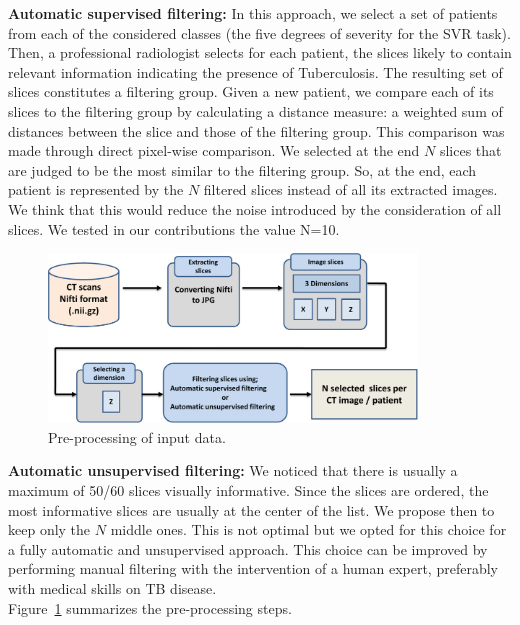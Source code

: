 \documentclass{llncs}
\begin{document}
\textbf{Automatic supervised filtering:} In this approach, we select a set of patients from each of the considered classes (the five degrees of severity for the SVR task). Then, a professional radiologist selects for each patient, the slices likely to contain relevant information indicating the presence of Tuberculosis. The resulting set of slices constitutes a filtering group. Given a new patient, we compare each of its slices to the filtering group by calculating a distance measure:  a weighted sum of distances between the slice and those of the filtering group. This comparison was made through direct pixel-wise comparison. We selected at the end $N$ slices that are judged to be the most similar to the filtering group. So, at the end, each patient is represented by the $N$ filtered slices instead of all its extracted images. We think that this would reduce the noise introduced by the consideration of all slices. We tested in our contributions the value N=10.

\begin{figure}
\includegraphics[width=\textwidth,height=4.5cm]{preprocess.pdf}
\caption{Pre-processing of input data.} 
\label{fig:preprocess}
\end{figure}

\textbf{Automatic unsupervised filtering:}
We noticed that there is usually a maximum of 50/60 slices visually informative. Since the slices are ordered, the most informative slices are usually at the center of the list. We propose then to keep only the $N$ middle ones. This is not optimal but we opted for this choice for a fully automatic and unsupervised approach. This choice can be improved by performing manual filtering with the intervention of a human expert, preferably with medical skills on TB disease.\\

Figure~\ref{fig:preprocess} summarizes the pre-processing steps.

 
\end{document}
